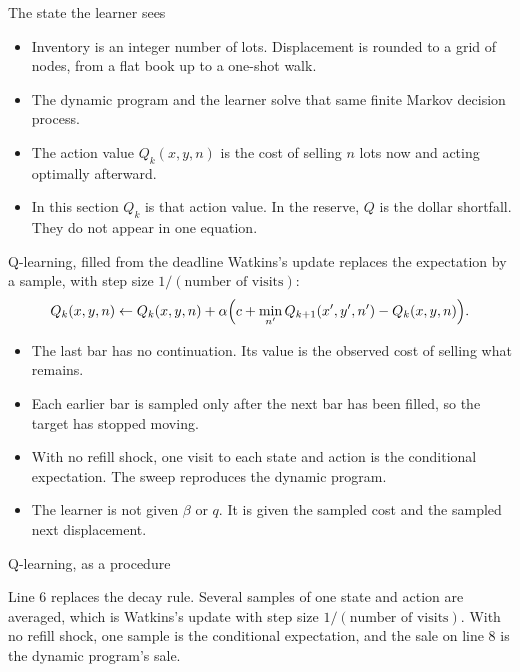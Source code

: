 \documentclass[aspectratio=169,10pt]{beamer}
\newcommand{\currentsource}{}
\newcommand{\framesource}[1]{\gdef\currentsource{#1}}
\newcommand{\aiassisted}{AI assisted, via Grok 4.7}
\begin{document}
\begin{frame}{The state the learner sees}
\framesource{\aiassisted}
\begin{itemize}
\item Inventory is an integer number of lots. Displacement is rounded to a grid of nodes, from a flat book up to a one-shot walk.
\item The dynamic program and the learner solve that same finite Markov decision process.
\item The action value \(Q_k(x,y,n)\) is the cost of selling \(n\) lots now and acting optimally afterward.
\item In this section \(Q_k\) is that action value. In the reserve, \(Q\) is the dollar shortfall. They do not appear in one equation.
\end{itemize}
\end{frame}

\begin{frame}{Q-learning, filled from the deadline}
\framesource{Watkins and Dayan, 1992. Finite-horizon sweep: \aiassisted.}
Watkins's update replaces the expectation by a sample, with step size \(1/(\text{number of visits})\):
\[
Q_k(x,y,n)
\leftarrow
Q_k(x,y,n)
+\alpha\Bigl(
c+\min_{n'}Q_{k+1}(x',y',n')
-Q_k(x,y,n)
\Bigr).
\]
\begin{itemize}
\item The last bar has no continuation. Its value is the observed cost of selling what remains.
\item Each earlier bar is sampled only after the next bar has been filled, so the target has stopped moving.
\item With no refill shock, one visit to each state and action is the conditional expectation. The sweep reproduces the dynamic program.
\item The learner is not given \(\beta\) or \(q\). It is given the sampled cost and the sampled next displacement.
\end{itemize}
\end{frame}

\begin{frame}{Q-learning, as a procedure}
\framesource{Watkins and Dayan, 1992. Procedure: \aiassisted.}
\usebox{\qalg}

\vspace{0.7em}
Line 6 replaces the decay rule. Several samples of one state and action are averaged, which is Watkins's update with step size \(1/(\text{number of visits})\). With no refill shock, one sample is the conditional expectation, and the sale on line 8 is the dynamic program's sale.
\end{frame}
\end{document}
